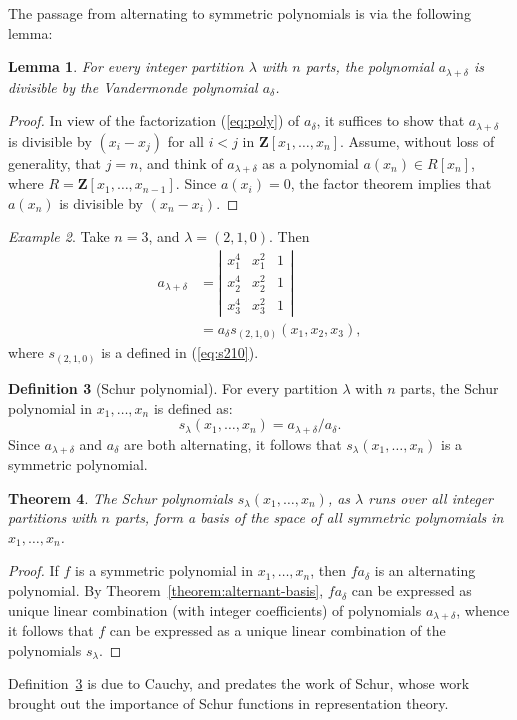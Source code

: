 \documentclass{amsart}
\theoremstyle{plain}
\newtheorem{theorem}{Theorem}[section]
\newtheorem{lemma}[theorem]{Lemma}
\theoremstyle{definition}
\newtheorem{definition}[theorem]{Definition}
\theoremstyle{remark}
\newtheorem{example}[theorem]{Example}
\begin{document}
The passage from alternating to symmetric polynomials is via the following lemma:
\begin{lemma}
  For every integer partition $\lambda$ with $n$ parts, the polynomial $a_{\lambda+\delta}$ is divisible by the Vandermonde polynomial $a_\delta$.
\end{lemma}
\begin{proof}
  In view of the factorization (\ref{eq:poly}) of $a_\delta$, it suffices to show that $a_{\lambda+\delta}$ is divisible by $(x_i-x_j)$ for all $i<j$ in $\mathbf Z[x_1,\dotsc,x_n]$.
  Assume, without loss of generality, that $j=n$, and think of $a_{\lambda+\delta}$ as a polynomial $a(x_n)\in R[x_n]$, where $R=\mathbf Z[x_1,\dotsc,x_{n-1}]$.
  Since $a(x_i)=0$, the factor theorem implies that $a(x_n)$ is divisible by $(x_n-x_i)$.
\end{proof}
\begin{example}
  Take $n=3$, and $\lambda = (2,1,0)$.
  Then
  \begin{align*}
    a_{\lambda+\delta} & = \left|
      \begin{matrix}
        x_1^4 & x_1^2 & 1\\
        x_2^4 & x_2^2 & 1\\
        x_3^4 & x_3^2 & 1
      \end{matrix}
    \right|\\
    & = a_\delta s_{(2,1,0)}(x_1,x_2,x_3),
  \end{align*}
  where $s_{(2,1,0)}$ is a defined in (\ref{eq:s210}).
\end{example}
\begin{definition}
  [Schur polynomial]
  \label{definition:schur-poly}
  For every partition $\lambda$ with $n$ parts, the Schur polynomial in $x_1,\dotsc,x_n$ is defined as:
  \begin{displaymath}
    s_\lambda(x_1,\dotsc,x_n) = a_{\lambda+\delta}/a_\delta.
  \end{displaymath}
  Since $a_{\lambda+\delta}$ and $a_\delta$ are both alternating, it follows that $s_\lambda(x_1,\dotsc,x_n)$ is a symmetric polynomial.
\end{definition}
\begin{theorem}
  The Schur polynomials $s_\lambda(x_1,\dotsc,x_n)$, as $\lambda$ runs over all integer partitions with $n$ parts, form a basis of the space of all symmetric polynomials in $x_1,\dotsc,x_n$.
\end{theorem}
\begin{proof}
  If $f$ is a symmetric polynomial in $x_1,\dotsc,x_n$, then $fa_\delta$ is an alternating polynomial.
  By Theorem~\ref{theorem:alternant-basis}, $fa_\delta$ can be expressed as unique linear combination (with integer coefficients) of polynomials $a_{\lambda+\delta}$, whence it follows that $f$ can be expressed as a unique linear combination of the polynomials $s_\lambda$. 
\end{proof}
Definition~\ref{definition:schur-poly} is due to Cauchy, and predates the work of Schur, whose work brought out the importance of Schur functions in representation theory.
\end{document}
